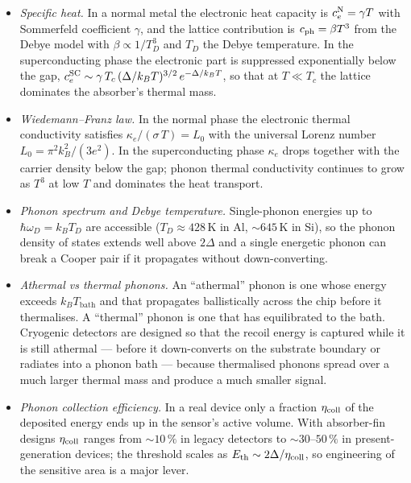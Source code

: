 \begin{itemize}
  \item \emph{Specific heat.}  In a normal metal the electronic
        heat capacity is $c_e^{\rm N}=\gamma T$ with Sommerfeld
        coefficient $\gamma$, and the lattice contribution is
        $c_{\rm ph}=\beta T^3$ from the Debye model with
        $\beta\propto 1/T_D^3$ and $T_D$ the Debye temperature.
        In the superconducting phase the electronic part is
        suppressed exponentially below the gap,
        $c_e^{\rm SC}\sim \gamma\, T_c\,(\Delta/k_B T)^{3/2}\,e^{-\Delta/k_B T}$,
        so that at $T\ll T_c$ the lattice dominates the absorber's
        thermal mass.
  \item \emph{Wiedemann--Franz law.}  In the normal phase the
        electronic thermal conductivity satisfies
        $\kappa_e/(\sigma\,T) = L_0$ with the universal Lorenz
        number $L_0=\pi^2 k_B^2/(3 e^2)$. In the superconducting
        phase $\kappa_e$ drops together with the carrier density
        below the gap; phonon thermal conductivity continues
        to grow as $T^3$ at low $T$ and dominates the heat
        transport.
  \item \emph{Phonon spectrum and Debye temperature.}  Single-phonon
        energies up to $\hbar\omega_D=k_B T_D$ are accessible
        ($T_D\approx 428\,\text{K}$ in Al, $\sim 645\,\text{K}$ in
        Si), so the phonon density of states extends well above
        $2\Delta$ and a single energetic phonon can break a Cooper
        pair if it propagates without down-converting.
  \item \emph{Athermal vs thermal phonons.}  An ``athermal'' phonon
        is one whose energy exceeds $k_B T_\text{bath}$ and that
        propagates ballistically across the chip before it
        thermalises. A ``thermal'' phonon is one that has
        equilibrated to the bath. Cryogenic detectors are
        designed so that the recoil energy is captured while it
        is still athermal --- before it down-converts on the
        substrate boundary or radiates into a phonon bath ---
        because thermalised phonons spread over a much larger
        thermal mass and produce a much smaller signal.
  \item \emph{Phonon collection efficiency.}  In a real device
        only a fraction $\eta_{\rm coll}$ of the deposited energy
        ends up in the sensor's active volume. With absorber-fin
        designs $\eta_{\rm coll}$ ranges from $\sim 10\,\%$ in
        legacy detectors to $\sim 30\text{--}50\,\%$ in
        present-generation devices; the threshold scales as
        $E_\text{th}\sim 2\Delta/\eta_{\rm coll}$, so engineering
        of the sensitive area is a major lever.
\end{itemize}


